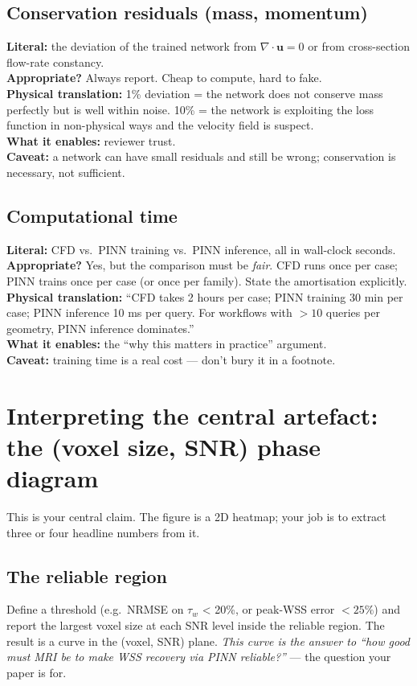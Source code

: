 \documentclass[11pt]{article}
\begin{document}
\subsection*{Conservation residuals (mass, momentum)}
\textbf{Literal:} the deviation of the trained network from $\nabla\cdot\mathbf{u} = 0$ or from cross-section flow-rate constancy.\\
\textbf{Appropriate?} Always report. Cheap to compute, hard to fake.\\
\textbf{Physical translation:} 1\% deviation = the network does not conserve mass perfectly but is well within noise. 10\% = the network is exploiting the loss function in non-physical ways and the velocity field is suspect.\\
\textbf{What it enables:} reviewer trust.\\
\textbf{Caveat:} a network can have small residuals and still be wrong; conservation is necessary, not sufficient.

\subsection*{Computational time}
\textbf{Literal:} CFD vs.\ PINN training vs.\ PINN inference, all in wall-clock seconds.\\
\textbf{Appropriate?} Yes, but the comparison must be \emph{fair}. CFD runs once per case; PINN trains once per case (or once per family). State the amortisation explicitly.\\
\textbf{Physical translation:} ``CFD takes 2 hours per case; PINN training 30 min per case; PINN inference 10 ms per query. For workflows with $>10$ queries per geometry, PINN inference dominates.''\\
\textbf{What it enables:} the ``why this matters in practice'' argument.\\
\textbf{Caveat:} training time is a real cost --- don't bury it in a footnote.

\section{Interpreting the central artefact: the (voxel size, SNR) phase diagram}

This is your central claim. The figure is a 2D heatmap; your job is to extract three or four headline numbers from it.

\subsection*{The reliable region}
Define a threshold (e.g.\ NRMSE on $\tau_w$ < 20\%, or peak-WSS error $< 25\%$) and report the largest voxel size at each SNR level inside the reliable region. The result is a curve in the (voxel, SNR) plane. \emph{This curve is the answer to ``how good must MRI be to make WSS recovery via PINN reliable?''} --- the question your paper is for.
\end{document}
